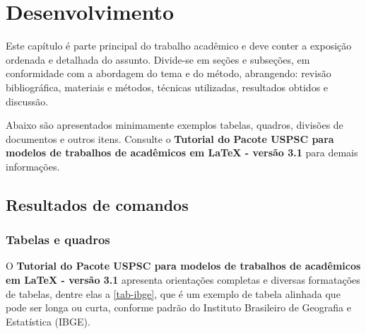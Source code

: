

\chapter{Desenvolvimento}\label{cap_exemplos}
Este capítulo é parte principal do trabalho acadêmico e deve conter a exposição ordenada e detalhada do assunto. Divide-se em seções e subseções, em conformidade com a abordagem do tema e do método, abrangendo: revisão bibliográfica, materiais e métodos, técnicas utilizadas, resultados obtidos e discussão.

Abaixo são apresentados minimamente exemplos tabelas, quadros, divisões de documentos e outros itens. Consulte o \textbf{Tutorial do Pacote USPSC para modelos de trabalhos de acad\^emicos em LaTeX - vers\~ao 3.1} para demais informações. 

\section{Resultados de comandos}\label{sec-divisoes}

\subsection{Tabelas e quadros}

O \textbf{Tutorial do Pacote USPSC para modelos de trabalhos de acad\^emicos em LaTeX - vers\~ao 3.1} apresenta orientações completas e diversas formatações de tabelas, dentre elas a \autoref{tab-ibge}, que é um exemplo de tabela alinhada que pode ser longa ou curta, conforme padrão do Instituto Brasileiro de Geografia e Estatística (IBGE).

\begin{table}[htb]
\end{table}


